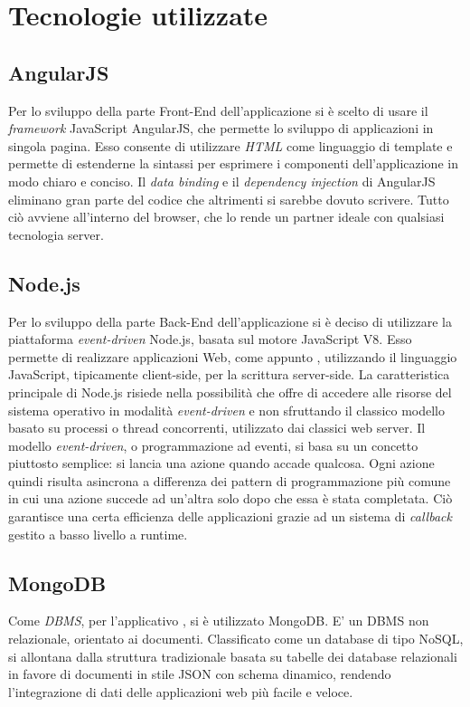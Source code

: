 \newpage
\section{Tecnologie utilizzate}
\subsection{AngularJS}
Per lo sviluppo della parte Front-End dell'applicazione si è scelto di usare il \textit{framework} JavaScript AngularJS, che permette lo sviluppo di applicazioni in singola pagina. Esso consente di utilizzare \textit{HTML} come linguaggio di template e permette di estenderne la sintassi per esprimere i componenti dell'applicazione in modo chiaro e conciso. Il \textit{data binding} e il \textit{dependency injection} di AngularJS eliminano gran parte del codice che altrimenti si sarebbe dovuto scrivere. Tutto ciò avviene all'interno del browser, che lo rende un partner ideale con qualsiasi tecnologia server.
\subsection{Node.js}
Per lo sviluppo della parte Back-End dell'applicazione si è deciso di utilizzare la piattaforma \textit{event-driven} Node.js, basata sul motore JavaScript V8. Esso permette di realizzare applicazioni Web, come appunto \progetto, utilizzando il linguaggio JavaScript, tipicamente client-side, per la scrittura server-side. La caratteristica principale di Node.js risiede nella possibilità che offre di accedere alle risorse del sistema operativo in modalità \textit{event-driven} e non sfruttando il classico modello basato su processi o thread concorrenti, utilizzato dai classici web server. Il modello \textit{event-driven}, o programmazione ad eventi, si basa su un concetto piuttosto semplice: si lancia una azione quando accade qualcosa. Ogni azione quindi risulta asincrona a differenza dei pattern di programmazione più comune in cui una azione succede ad un’altra solo dopo che essa è stata completata. Ciò garantisce una certa efficienza delle applicazioni grazie ad un sistema di \textit{callback} gestito a basso livello a runtime.
\subsection{MongoDB}
Come \textit{DBMS}, per l'applicativo \progetto, si è utilizzato MongoDB. E' un DBMS non relazionale, orientato ai documenti. Classificato come un database di tipo NoSQL, si allontana dalla struttura tradizionale basata su tabelle dei database relazionali in favore di documenti in stile JSON con schema dinamico, rendendo l'integrazione di dati delle applicazioni web più facile e veloce. 
